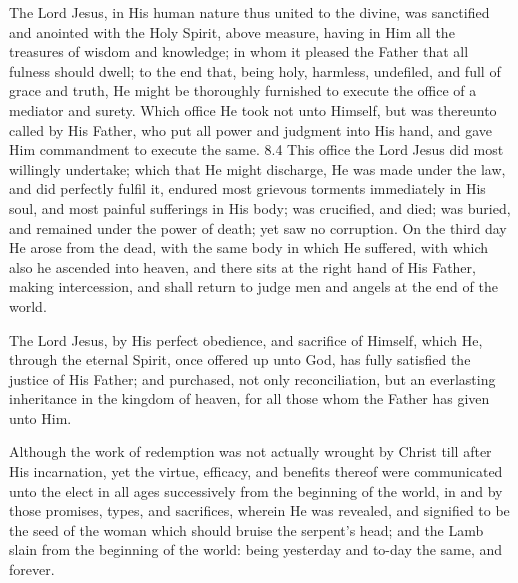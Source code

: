 \begin{outerlst}[left=0pt,labelsep=0pt]
\begin{innerlst}[resume*]
\item The Lord Jesus, in His human nature thus united to the divine, was sanctified and anointed with the Holy Spirit, above measure, having in Him all the treasures of wisdom and knowledge; in whom it pleased the Father that all fulness should dwell; to the end that, being holy, harmless, undefiled, and full of grace and truth, He might be thoroughly furnished to execute the office of a mediator and surety. Which office He took not unto Himself, but was thereunto called by His Father, who put all power and judgment into His hand, and gave Him commandment to execute the same.  8.4 This office the Lord Jesus did most willingly undertake; which that He might discharge, He was made under the law, and did perfectly fulfil it, endured most grievous torments immediately in His soul, and most painful sufferings in His body; was crucified, and died; was buried, and remained under the power of death; yet saw no corruption. On the third day He arose from the dead, with the same body in which He suffered, with which also he ascended into heaven, and there sits at the right hand of His Father, making intercession, and shall return to judge men and angels at the end of the world.   

\item The Lord Jesus, by His perfect obedience, and sacrifice of Himself, which He, through the eternal Spirit, once offered up unto God, has fully satisfied the justice of His Father; and purchased, not only reconciliation, but an everlasting inheritance in the kingdom of heaven, for all those whom the Father has given unto Him.   

\item Although the work of redemption was not actually wrought by Christ till after His incarnation, yet the virtue, efficacy, and benefits thereof were communicated unto the elect in all ages successively from the beginning of the world, in and by those promises, types, and sacrifices, wherein He was revealed, and signified to be the seed of the woman which should bruise the serpent{}'s head; and the Lamb slain from the beginning of the world: being yesterday and to-day the same, and forever.   


\end{innerlst}
\end{outerlst}
